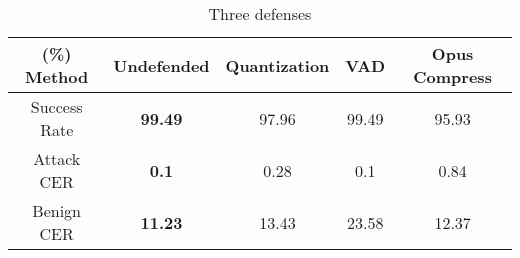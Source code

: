 \begin{table}[t]
\footnotesize
\centering
\renewcommand\arraystretch{0.8} 
\setlength\tabcolsep{2.8pt}
\caption{Three defenses}
\begin{tabular}{c|c|c|c|c}
\toprule[1pt]
\multicolumn{1}{c|}{\textbf{(\%) Method}} & \multicolumn{1}{c|}{\textbf{Undefended}} & \textbf{Quantization} & \textbf{VAD}   & \textbf{Opus Compress} \\ \midrule[0.8pt]
\multicolumn{1}{c|}{Success Rate}                      & \textbf{99.49}                           & 97.96        & 99.49 & 95.93         \\ \midrule
\multicolumn{1}{c|}{Attack CER}                      & \textbf{0.1}                            & 0.28         & 0.1  & 0.84          \\ \midrule
\multicolumn{1}{c|}{Benign CER }                     & \textbf{11.23}                           & 13.43        & 23.58 & 12.37         \\ \bottomrule[1pt]
\end{tabular}
\label{tab:definitive}
\vspace{-5pt}
\end{table}

